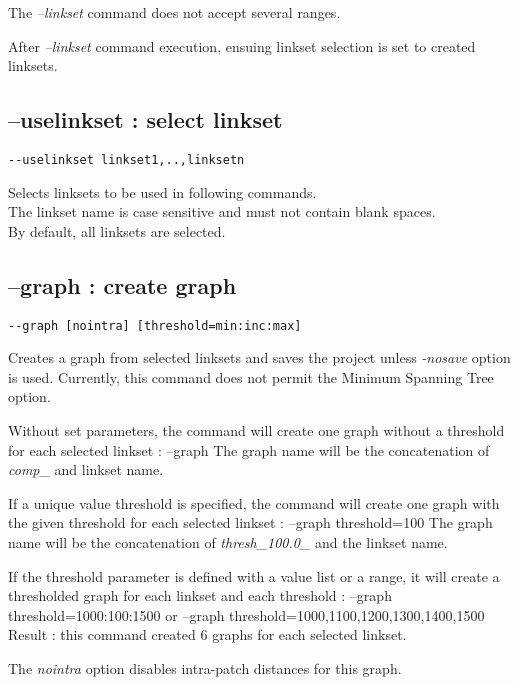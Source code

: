 \documentclass[a4paper,10pt]{report}
\newenvironment{cmd}
{\quote\Verbatim}
{\endVerbatim\endquote}
\begin{document}
The \textit{--linkset} command does not accept several ranges.

After \textit{--linkset} command execution, ensuing linkset selection is set to created linksets. 

\subsection{--uselinkset : select linkset}
\begin{verbatim}
--uselinkset linkset1,..,linksetn
\end{verbatim}
Selects linksets to be used in following commands.\\
The linkset name is case sensitive and must not contain blank spaces.\\
By default, all linksets are selected.

\subsection{--graph : create graph}
\begin{verbatim}
--graph [nointra] [threshold=min:inc:max]
\end{verbatim}
Creates a graph from selected linksets and saves the project unless \textit{-nosave} option is used. 
Currently, this command does not permit the Minimum Spanning Tree option.

Without set parameters, the command will create one graph without a threshold for each selected linkset :
\begin{cmd}
--graph
\end{cmd}
The graph name will be the concatenation of \textit{comp\_} and linkset name.

If a unique value threshold is specified, the command will create one graph with the given threshold for each selected linkset :
\begin{cmd}
--graph threshold=100
\end{cmd}
The graph name will be the concatenation of \textit{thresh\_100.0\_} and the linkset name.

If the threshold parameter is defined with a value list or a range, it will create a thresholded graph for each linkset and each threshold :
\begin{cmd}
--graph threshold=1000:100:1500
or
--graph threshold=1000,1100,1200,1300,1400,1500
\end{cmd}
Result : this command created 6 graphs for each selected linkset.

The \textit{nointra} option disables intra-patch distances for this graph.
\end{document}
